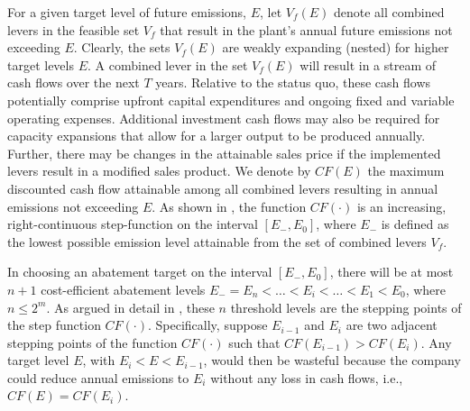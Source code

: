 \documentclass[12pt, a4paper]{article} %
\newcommand{\methods}{\nameref{sec: methods}} %
\begin{document}
For a given target level of future emissions, $E$, let $V_f(E)$ denote all combined levers in the feasible set $V_f$ that result in the plant's annual future emissions not exceeding $E$. Clearly, the sets $V_f(E)$ are weakly expanding (nested) for higher target levels $E$. A combined lever in the set $V_f(E)$ will result in a stream of cash flows over the next $T$ years. Relative to the status quo, these cash flows potentially comprise upfront capital expenditures and ongoing fixed and variable operating expenses. Additional investment cash flows may also be required for capacity expansions that allow for a larger output to be produced annually. Further, there may be changes in the attainable sales price if the implemented levers result in a modified sales product. We denote by $CF(E)$ the maximum discounted cash flow attainable among all combined levers resulting in annual emissions not exceeding $E$. As shown in \methods, the function $CF(\cdot)$ is an increasing, right-continuous step-function on the interval $[E_-, E_0]$, where $E_-$ is defined as the lowest possible emission level attainable from the set of combined levers $V_f$.

In choosing an abatement target on the interval $[E_-, E_0]$, there will be at most $n+1$ cost-efficient abatement levels $E_- = E_n < \ldots < E_i < \ldots < E_1 <E_0$, where $n \leq 2^m$. As argued in detail in \methods, these $n$ threshold levels are the stepping points of the step function $CF(\cdot)$. Specifically, suppose $E_{i-1}$ and $E_{i}$ are two adjacent stepping points of the function $CF(\cdot)$ such that $CF(E_{i-1}) > CF(E_{i})$. Any target level $E$, with $E_{i} < E < E_{i-1}$, would then be wasteful because the company could reduce annual emissions to $E_i$ without any loss in cash flows, i.e., $CF(E) = CF(E_{i})$.
\end{document}
